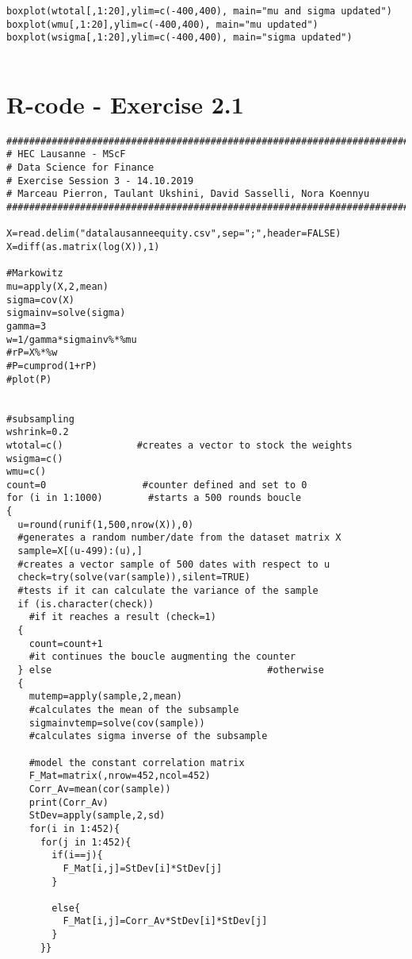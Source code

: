 \begin{appendices}
\begin{verbatim}
boxplot(wtotal[,1:20],ylim=c(-400,400), main="mu and sigma updated")
boxplot(wmu[,1:20],ylim=c(-400,400), main="mu updated")
boxplot(wsigma[,1:20],ylim=c(-400,400), main="sigma updated")


\end{verbatim}

\chapter{R-code - Exercise 2.1}

\begin{verbatim}
##########################################################################
# HEC Lausanne - MScF
# Data Science for Finance
# Exercise Session 3 - 14.10.2019
# Marceau Pierron, Taulant Ukshini, David Sasselli, Nora Koennyu
##########################################################################

X=read.delim("datalausanneequity.csv",sep=";",header=FALSE)
X=diff(as.matrix(log(X)),1)

#Markowitz
mu=apply(X,2,mean)
sigma=cov(X)
sigmainv=solve(sigma)
gamma=3
w=1/gamma*sigmainv%*%mu
#rP=X%*%w
#P=cumprod(1+rP)
#plot(P)


#subsampling
wshrink=0.2
wtotal=c()             #creates a vector to stock the weights
wsigma=c()
wmu=c()
count=0                 #counter defined and set to 0
for (i in 1:1000)        #starts a 500 rounds boucle
{
  u=round(runif(1,500,nrow(X)),0)               
  #generates a random number/date from the dataset matrix X
  sample=X[(u-499):(u),]                        
  #creates a vector sample of 500 dates with respect to u
  check=try(solve(var(sample)),silent=TRUE)     
  #tests if it can calculate the variance of the sample
  if (is.character(check))                      
    #if it reaches a result (check=1)
  {
    count=count+1                             
    #it continues the boucle augmenting the counter
  } else                                      #otherwise
  { 
    mutemp=apply(sample,2,mean)               
    #calculates the mean of the subsample
    sigmainvtemp=solve(cov(sample))           
    #calculates sigma inverse of the subsample
    
    #model the constant correlation matrix
    F_Mat=matrix(,nrow=452,ncol=452)
    Corr_Av=mean(cor(sample))
    print(Corr_Av)
    StDev=apply(sample,2,sd)
    for(i in 1:452){
      for(j in 1:452){
        if(i==j){
          F_Mat[i,j]=StDev[i]*StDev[j]
        }
        
        else{
          F_Mat[i,j]=Corr_Av*StDev[i]*StDev[j]
        }
      }}                                
      

\end{verbatim}
\end{appendices}
